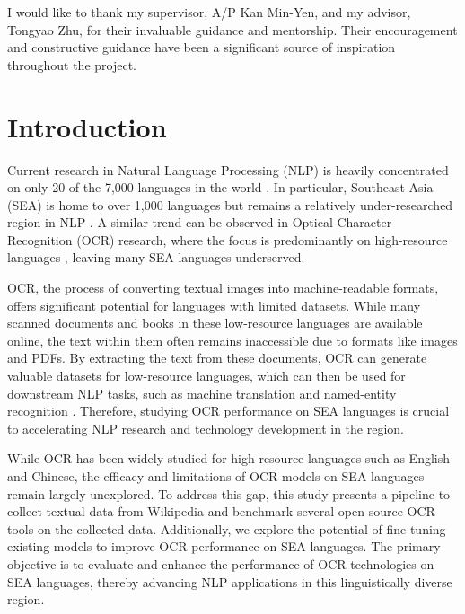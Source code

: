 \documentclass[12pt,oneside]{memoir}
\begin{document}
I would like to thank my supervisor, A/P Kan Min-Yen, and my advisor, Tongyao Zhu, for their invaluable guidance and mentorship. Their encouragement and constructive guidance have been a significant source of inspiration throughout the project.

\listoffigures
\listoftables
\tableofcontents

\mainmatter

\chapter{Introduction}
Current research in Natural Language Processing (NLP) is heavily concentrated on only 20 of the 7,000 languages in the world \parencite{magueresse-etal-2020}.
In particular, Southeast Asia (SEA) is home to over 1,000 languages but remains a relatively under-researched region in NLP \parencite{aji-etal-2023}.
A similar trend can be observed in Optical Character Recognition (OCR) research, where the focus is predominantly on high-resource languages \parencite{salehudin-etal-2023, smith-2007}, leaving many SEA languages underserved.

OCR, the process of converting textual images into machine-readable formats, offers significant potential for languages with limited datasets. While many scanned documents and books in these low-resource languages are available online, the text within them often remains inaccessible due to formats like images and PDFs. By extracting the text from these documents, OCR can generate valuable datasets for low-resource languages, which can then be used for downstream NLP tasks, such as machine translation and named-entity recognition \parencite{agarwal-and-anastasopoulos-2024, ignat-etal-2022}.
Therefore, studying OCR performance on SEA languages is crucial to accelerating NLP research and technology development in the region.

While OCR has been widely studied for high-resource languages such as English and Chinese, the efficacy and limitations of OCR models on SEA languages remain largely unexplored.
To address this gap, this study presents a pipeline to collect textual data from Wikipedia and benchmark several open-source OCR tools on the collected data. Additionally, we explore the potential of fine-tuning existing models to improve OCR performance on SEA languages. The primary objective is to evaluate and enhance the performance of OCR technologies on SEA languages, thereby advancing NLP applications in this linguistically diverse region.
\end{document}
